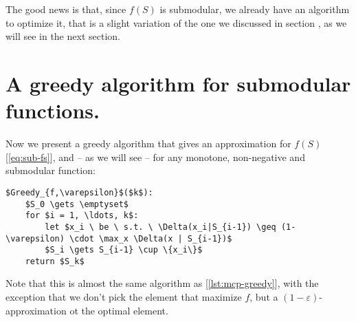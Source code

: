 The good news is that, since $f(S)$ is submodular, we already have an algorithm to optimize it, that is a slight variation of the one we discussed in section , as we will see in the next section.


\section{A greedy algorithm for submodular functions.} \label{sec:submodular-greedy}

Now we present a greedy algorithm that gives an approximation for $f(S)$ [\ref{eq:sub-fs}], and -- as we will see -- for any monotone, non-negative and submodular function:
\begin{lstlisting}[caption={Greedy algorithm},label={lst:fS-greedysm}]
$Greedy_{f,\varepsilon}$($k$):
    $S_0 \gets \emptyset$
    for $i = 1, \ldots, k$:
        let $x_i \ be \ s.t. \ \Delta(x_i|S_{i-1}) \geq (1- \varepsilon) \cdot \max_x \Delta(x | S_{i-1})$
        $S_i \gets S_{i-1} \cup \{x_i\}$
    return $S_k$
\end{lstlisting}
Note that this is almost the same algorithm as [\ref{lst:mcp-greedy}], with the exception that we don't pick the element that maximize $f$, but a $(1-\varepsilon)$-approximation ot the optimal element.

